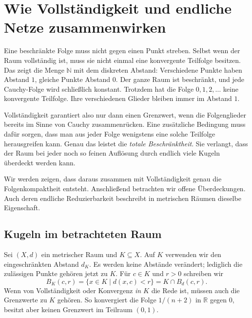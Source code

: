 \chapter*{Wie Vollständigkeit und endliche Netze zusammenwirken}
\hypertarget{compactness.reading}{}

Eine beschränkte Folge muss nicht gegen einen Punkt streben. Selbst wenn
der Raum vollständig ist, muss sie nicht einmal eine konvergente Teilfolge
besitzen. Das zeigt die Menge \(\mathbb N\) mit dem diskreten Abstand:
Verschiedene Punkte haben Abstand \(1\), gleiche Punkte Abstand \(0\).
Der ganze Raum ist beschränkt, und jede Cauchy-Folge wird schließlich
konstant. Trotzdem hat die Folge \(0,1,2,\ldots\) keine konvergente
Teilfolge. Ihre verschiedenen Glieder bleiben immer im Abstand \(1\).

Vollständigkeit garantiert also nur dann einen Grenzwert, wenn die
Folgenglieder bereits im Sinne von Cauchy zusammenrücken. Eine zusätzliche
Bedingung muss dafür sorgen, dass man aus jeder Folge wenigstens eine
solche Teilfolge herausgreifen kann. Genau das leistet die
\emph{totale Beschränktheit}. Sie verlangt, dass der Raum bei jeder noch
so feinen Auflösung durch endlich viele Kugeln überdeckt werden kann.

Wir werden zeigen, dass daraus zusammen mit Vollständigkeit genau die
Folgenkompaktheit entsteht. Anschließend betrachten wir offene
Überdeckungen. Auch deren endliche Reduzierbarkeit beschreibt in
metrischen Räumen dieselbe Eigenschaft.

\section*{Kugeln im betrachteten Raum}

Sei \((X,d)\) ein metrischer Raum und \(K\subseteq X\). Auf \(K\)
verwenden wir den eingeschränkten Abstand \(d_K\). Es werden keine
Abstände verändert; lediglich die zulässigen Punkte gehören jetzt zu
\(K\). Für \(c\in K\) und \(r>0\) schreiben wir
\[
 B_K(c,r)=\{x\in K\mid d(x,c)<r\}
          =K\cap B_d(c,r).
\]
Wenn von Vollständigkeit oder Konvergenz \emph{in \(K\)} die Rede ist,
müssen auch die Grenzwerte zu \(K\) gehören. So konvergiert die Folge
\(1/(n+2)\) in \(\mathbb R\) gegen \(0\), besitzt aber keinen Grenzwert
im Teilraum \((0,1)\).


